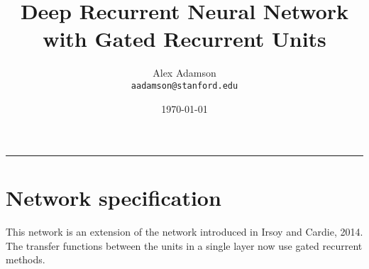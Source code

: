 \documentclass[12pt]{article}
\title{Deep Recurrent Neural Network with Gated Recurrent Units}
\author{Alex Adamson \\ \texttt{aadamson@stanford.edu}}
\date{\today}
\begin{document}
  \maketitle

  \vspace{-0.3in}
  \rule{\linewidth}{0.4pt}


  \section{Network specification}

    This network is an extension of the network introduced in Irsoy and Cardie, 2014. The transfer functions between the units in a single layer now use gated recurrent methods.
\end{document}
